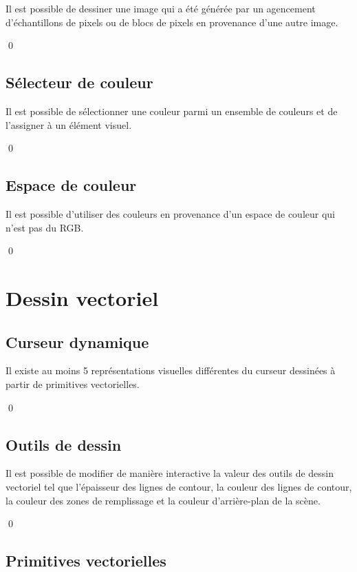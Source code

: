 \documentclass[12pt]{article}
\newcommand{\state}{\noindent}
\begin{document}
\state
Il est possible de dessiner une image qui a été générée par un agencement d'échantillons de pixels ou de blocs de pixels en provenance d'une autre image.

\qed

\subsection{Sélecteur de couleur}

\state
Il est possible de sélectionner une couleur parmi un ensemble de couleurs et de l'assigner à un élément visuel.

\qed

\subsection{Espace de couleur}

\state
Il est possible d'utiliser des couleurs en provenance d'un espace de couleur qui n'est pas du RGB.

\qed

\pagebreak

\section{Dessin vectoriel}

\subsection{Curseur dynamique}

\state
Il existe au moins 5 représentations visuelles différentes du curseur dessinées à partir de primitives vectorielles.

\qed

\subsection{Outils de dessin}

\state
Il est possible de modifier de manière interactive la valeur des outils de dessin vectoriel tel que l'épaisseur des lignes de contour, la couleur des lignes de contour, la couleur des zones de remplissage et la couleur d'arrière-plan de la scène.

\qed

\subsection{Primitives vectorielles}
\end{document}

